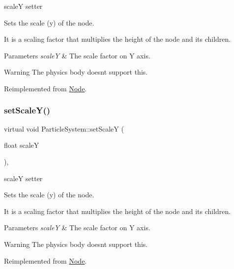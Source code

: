 scaleY setter 

Sets the scale (y) of the node.

It is a scaling factor that multiplies the height of the node and its children.


\begin{DoxyParams}{Parameters}
{\em scaleY} & The scale factor on Y axis.\\
\hline
\end{DoxyParams}
\begin{DoxyWarning}{Warning}
The physics body doesn\textquotesingle{}t support this. 
\end{DoxyWarning}


Reimplemented from \hyperlink{classNode_aec805a1fa9e8e1038556e468138bb804}{Node}.

\mbox{\label{classParticleSystem_a1e6720f314dfec3f5b7ca02c305ea28e}} 
\subsubsection{\texorpdfstring{set\+Scale\+Y()}{setScaleY()}\hspace{0.1cm}{\footnotesize\ttfamily [2/2]}}
{\footnotesize\ttfamily virtual void Particle\+System\+::set\+ScaleY (\begin{DoxyParamCaption}\item[{float}]{scaleY }\end{DoxyParamCaption})\hspace{0.3cm}{\ttfamily [override]}, {\ttfamily [virtual]}}



scaleY setter 

Sets the scale (y) of the node.

It is a scaling factor that multiplies the height of the node and its children.


\begin{DoxyParams}{Parameters}
{\em scaleY} & The scale factor on Y axis.\\
\hline
\end{DoxyParams}
\begin{DoxyWarning}{Warning}
The physics body doesn\textquotesingle{}t support this. 
\end{DoxyWarning}


Reimplemented from \hyperlink{classNode_aec805a1fa9e8e1038556e468138bb804}{Node}.


